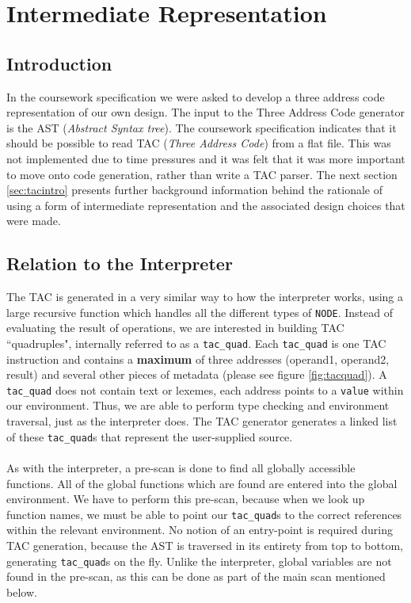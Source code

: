 \section{Intermediate Representation}

\subsection{Introduction}
In the coursework specification we were asked to develop a three address code representation of our own design. The input to the Three Address Code generator is the AST (\emph{Abstract Syntax tree}). The coursework specification indicates that it should be possible to read TAC (\emph{Three Address Code}) from a flat file. This was not implemented due to time pressures and it was felt that it was more important to move onto code generation, rather than write a TAC parser. The next section \ref{sec:tacintro} presents further background information behind the rationale of using a form of intermediate representation and the associated design choices that were made.

\subsection{Relation to the Interpreter}
The TAC is generated in a very similar way to how the interpreter works, using a large recursive function which handles all the different types of \verb!NODE!. Instead of evaluating the result of operations, we are interested in building TAC ``quadruples", internally referred to as a \verb!tac_quad!. Each \verb!tac_quad! is one TAC instruction and contains a \textbf{maximum} of three addresses (operand1, operand2, result) and several other pieces of metadata (please see figure \ref{fig:tacquad}). A \verb!tac_quad! does not contain text or lexemes, each address points to a \verb!value! within our environment. Thus, we are able to perform type checking and environment traversal, just as the interpreter does. The TAC generator generates a linked list of these \verb!tac_quad!s that represent the user-supplied \mmc source.
\ \\ \ \\
As with the interpreter, a pre-scan is done to find all globally accessible functions. All of the global functions which are found are entered into the global environment. We have to perform this pre-scan, because when we look up function names, we must be able to point our \verb!tac_quad!s to the correct references within the relevant environment. No notion of an entry-point is required during TAC generation, because the AST is traversed in its entirety from top to bottom, generating \verb!tac_quad!s on the fly. Unlike the interpreter, global variables are not found in the pre-scan, as this can be done as part of the main scan mentioned below.

